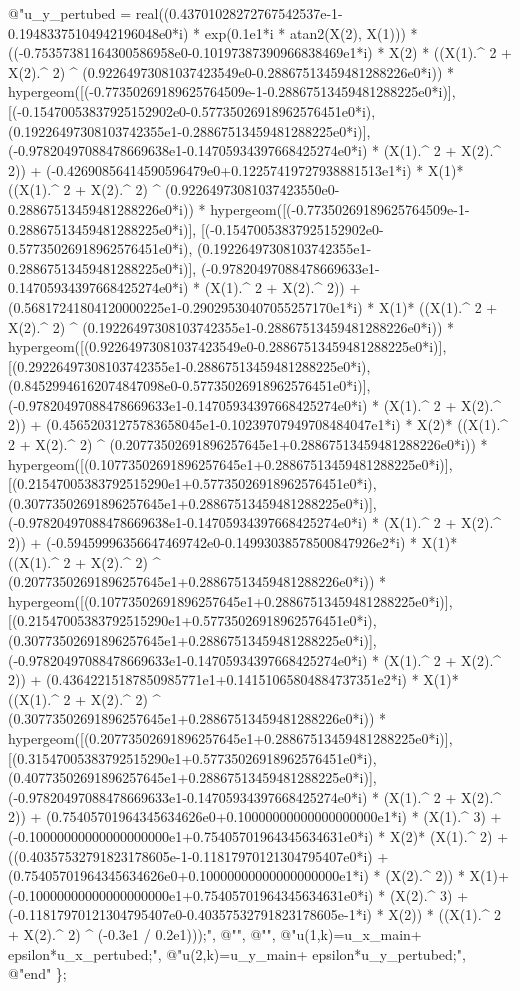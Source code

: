 {@"u\_y\_pertubed = real((0.43701028272767542537e-1-0.19483375104942196048e0*i) * exp(0.1e1*i * atan2(X(2), X(1))) * ((-0.75357381164300586958e0-0.10197387390966838469e1*i) * X(2) * ((X(1).^ 2 + X(2).^ 2) ^ (0.92264973081037423549e0-0.28867513459481288226e0*i)) * hypergeom([(-0.77350269189625764509e-1-0.28867513459481288225e0*i)], [(-0.15470053837925152902e0-0.57735026918962576451e0*i), (0.19226497308103742355e1-0.28867513459481288225e0*i)], (-0.97820497088478669638e1-0.14705934397668425274e0*i) * (X(1).^ 2 + X(2).^ 2)) + (-0.42690856414590596479e0+0.12257419727938881513e1*i) * X(1)* ((X(1).^ 2 + X(2).^ 2) ^ (0.92264973081037423550e0-0.28867513459481288226e0*i)) * hypergeom([(-0.77350269189625764509e-1-0.28867513459481288225e0*i)], [(-0.15470053837925152902e0-0.57735026918962576451e0*i), (0.19226497308103742355e1-0.28867513459481288225e0*i)], (-0.97820497088478669633e1-0.14705934397668425274e0*i) * (X(1).^ 2 + X(2).^ 2)) + (0.56817241804120000225e1-0.29029530407055257170e1*i) * X(1)* ((X(1).^ 2 + X(2).^ 2) ^ (0.19226497308103742355e1-0.28867513459481288226e0*i)) * hypergeom([(0.92264973081037423549e0-0.28867513459481288225e0*i)], [(0.29226497308103742355e1-0.28867513459481288225e0*i), (0.84529946162074847098e0-0.57735026918962576451e0*i)], (-0.97820497088478669633e1-0.14705934397668425274e0*i) * (X(1).^ 2 + X(2).^ 2)) + (0.45652031275783658045e1-0.10239707949708484047e1*i) * X(2)* ((X(1).^ 2 + X(2).^ 2) ^ (0.20773502691896257645e1+0.28867513459481288226e0*i)) * hypergeom([(0.10773502691896257645e1+0.28867513459481288225e0*i)], [(0.21547005383792515290e1+0.57735026918962576451e0*i), (0.30773502691896257645e1+0.28867513459481288225e0*i)], (-0.97820497088478669638e1-0.14705934397668425274e0*i) * (X(1).^ 2 + X(2).^ 2)) + (-0.59459996356647469742e0-0.14993038578500847926e2*i) * X(1)* ((X(1).^ 2 + X(2).^ 2) ^ (0.20773502691896257645e1+0.28867513459481288226e0*i)) * hypergeom([(0.10773502691896257645e1+0.28867513459481288225e0*i)], [(0.21547005383792515290e1+0.57735026918962576451e0*i), (0.30773502691896257645e1+0.28867513459481288225e0*i)], (-0.97820497088478669633e1-0.14705934397668425274e0*i) * (X(1).^ 2 + X(2).^ 2)) + (0.43642215187850985771e1+0.14151065804884737351e2*i) * X(1)* ((X(1).^ 2 + X(2).^ 2) ^ (0.30773502691896257645e1+0.28867513459481288226e0*i)) * hypergeom([(0.20773502691896257645e1+0.28867513459481288225e0*i)], [(0.31547005383792515290e1+0.57735026918962576451e0*i), (0.40773502691896257645e1+0.28867513459481288225e0*i)], (-0.97820497088478669633e1-0.14705934397668425274e0*i) * (X(1).^ 2 + X(2).^ 2)) + (0.75405701964345634626e0+0.10000000000000000000e1*i) * (X(1).^ 3) + (-0.10000000000000000000e1+0.75405701964345634631e0*i) * X(2)* (X(1).^ 2) + ((0.40357532791823178605e-1-0.11817970121304795407e0*i) + (0.75405701964345634626e0+0.10000000000000000000e1*i) * (X(2).^ 2)) * X(1)+ (-0.10000000000000000000e1+0.75405701964345634631e0*i) * (X(2).^ 3) + (-0.11817970121304795407e0-0.40357532791823178605e-1*i) * X(2)) * ((X(1).^ 2 + X(2).^ 2) ^ (-0.3e1 / 0.2e1)));",\newline 
@"",   \newline 
@"",    \newline 
@"u(1,k)=u\_x\_main+ epsilon*u\_x\_pertubed;",\newline 
@"u(2,k)=u\_y\_main+ epsilon*u\_y\_pertubed;",\newline 
@"end" \};
 }
